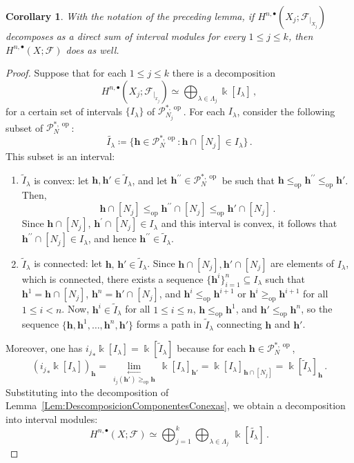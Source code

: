 \documentclass[reqno,12pt]{amsart}
\newcommand{\plim}[1]{\,\underset{#1}{\underset{\longleftarrow}{\lim}}\,}
\newcommand{\cF}{{\mathcal F}}
\newcommand{\cP}{\mathcal{P}}
\DeclareMathOperator{\op}{op}
\newcommand{\0}{\mathbf 0}
\newcommand{\h}{\mathbf{h}}
\newtheorem{corollary}[theorem]{Corollary}
\theoremstyle{definition}
\begin{document}
\begin{corollary}\label{Cor:DescomposicionComponentesConexas}
    With the notation of the preceding lemma, if $H^{n,\bullet}(X_j;\cF_{|_{X_j}})$ decomposes as a direct sum of interval modules for every $1\leq j\leq k$, then $H^{n,\bullet}(X;\cF)$ does as well.
\end{corollary}
\begin{proof}
    Suppose that for each $1\leq j\leq k$ there is a decomposition
    \begin{equation}\label{Eq:CohesiveDecompositionConnectedComponent}
        H^{n,\bullet}(X_j;\cF_{|_{x_j}})\simeq \bigoplus_{\lambda\in \Lambda_j}\Bbbk[I_{\lambda}]\, ,
    \end{equation}
    for a certain set of intervals $\{I_\lambda\}$ of $\cP_{N_j}^{*,\op}$. For each $I_\lambda$, consider the following subset of $\cP^{*,\op}_N$:
    \begin{equation}\label{Eq:IntervaloAsociado}
        \widetilde{I_\lambda}\coloneqq\{\h\in \cP^{*,\op}_N\colon \h \cap [N_j] \in I_\lambda\}\, .
    \end{equation}
    This subset is an interval:
    \begin{enumerate}
        \item $\widetilde{I}_\lambda$ is convex: let $\h,\h'\in \widetilde{I}_\lambda$, and let $\h^{\prime\prime}\in \cP^{*,\op}_N$ be such that $\h\leq_{\op}\h^{\prime\prime}\leq_{\op} \h'$. Then,
        \[
        \h\cap [N_j]\leq_{\op}\h^{\prime\prime}\cap [N_j]\leq_{\op} \h'\cap [N_j] \,.
        \]
        Since $\h\cap [N_j],\,\h^{\prime}\cap [N_j]\in I_\lambda$ and this interval is convex, it follows that $\h^{\prime\prime}\cap [N_j]\in I_\lambda$, and hence $\h^{\prime\prime}\in \widetilde{I}_\lambda$.
        \item $\widetilde{I}_\lambda$ is connected: let $\h,\,\h'\in \widetilde{I}_\lambda$. Since $\h\cap [N_j],\h'\cap [N_j]$ are elements of $ I_\lambda$, which is connected, there exists a sequence $\{\h^i\}_{i=1}^n\subseteq I_\lambda$ such that $\h^1=\h\cap [N_j]$, $\h^n=\h'\cap [N_j]$, and $\h^i\leq_{\op}\h^{i+1}$ or $\h^i\geq_{\op}\h^{i+1}$ for all $1\leq i<n$. Now, $\h^i\in \widetilde{I}_\lambda$ for all $1\leq i\leq n$, $\h\leq_{\op}\h^1$, and $\h'\leq_{\op}\h^n$, so the sequence $\{\h,\h^1,\dots,\h^n,\h'\}$ forms a path in $\widetilde{I}_\lambda$ connecting $\h$ and $\h'$.
    \end{enumerate}
    Moreover, one has ${i_j}_*\Bbbk[I_\lambda]=\Bbbk[\widetilde{I}_{\lambda}]$ because for each $\h\in \cP^{*,\op}_N$,
    \[
    ({i_j}_*\Bbbk[I_\lambda])_{\h}=\plim{i_j(\h')\geq_{\op}\h}\Bbbk[I_\lambda]_{\h'}=\Bbbk[I_\lambda]_{\h\cap [N_j]}=\Bbbk[\widetilde{I}_\lambda]_{\h}\,.
    \]
    Substituting into the decomposition of Lemma~\ref{Lem:DescomposicionComponentesConexas}, we obtain a decomposition into interval modules:
    $$H^{n,\bullet}(X;\cF)\simeq \bigoplus_{j=1}^k\bigoplus_{\lambda\in \Lambda_j}\, \Bbbk[\widetilde{I_\lambda}]\, .$$
\end{proof}
\end{document}
